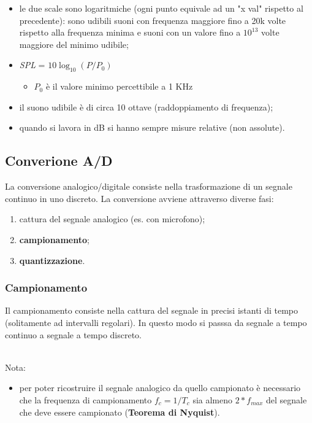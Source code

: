 \documentclass{article}
\begin{document}
			\begin{itemize}
				\item le due scale sono logaritmiche (ogni punto equivale ad un "x val" rispetto al precedente): sono udibili suoni con frequenza maggiore fino a 20k volte rispetto alla frequenza minima e suoni con un valore fino a $10^{13}$ volte maggiore del minimo udibile;
				\item \textit{SPL} = $10\log_{10}(P/P_{0})$
				\begin{itemize}
					\item $P_{0}$ è il valore minimo percettibile a 1 KHz
				\end{itemize}
				\item il suono udibile è di circa 10 ottave (raddoppiamento di frequenza);
				\item quando si lavora in dB si hanno sempre misure relative (non assolute).
			\end{itemize}
	
		\newpage
		\subsection{Converione A/D}
			La conversione analogico/digitale consiste nella trasformazione di un segnale continuo in uno discreto. La conversione avviene attraverso diverse fasi:
			\begin{enumerate}
				\item cattura del segnale analogico (es. con microfono);
				\item \textbf{campionamento};
				\item \textbf{quantizzazione}.
			\end{enumerate}

			\subsubsection{Campionamento}
				Il campionamento consiste nella cattura del segnale in precisi istanti di tempo (solitamente ad intervalli regolari). In questo modo si passsa da segnale a tempo continuo a segnale a tempo discreto.
				\begin{figure}[ht!]
				\end{figure}
				\\Nota:
				\begin{itemize}
					\item per poter ricostruire il segnale analogico da quello campionato è necessario che la frequenza di campionamento \textit{$f_{c} = 1/T_{c}$} sia almeno \textit{$2 * f_{max}$} del segnale che deve essere campionato (\textbf{Teorema di Nyquist}).
				\end{itemize}
\end{document}
